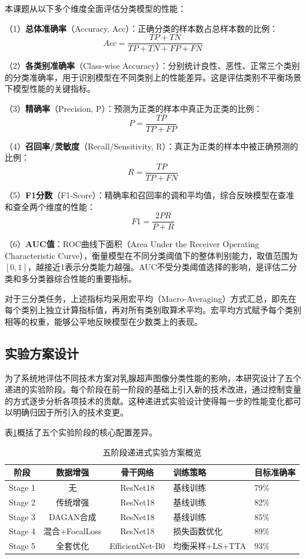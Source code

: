 本课题从以下多个维度全面评估分类模型的性能：

（1）\textbf{总体准确率}（Accuracy, Acc）：正确分类的样本数占总样本数的比例：
$$Acc = \frac{TP + TN}{TP + TN + FP + FN}$$

（2）\textbf{各类别准确率}（Class-wise Accuracy）：分别统计良性、恶性、正常三个类别的分类准确率，用于识别模型在不同类别上的性能差异。这是评估类别不平衡场景下模型性能的关键指标。

（3）\textbf{精确率}（Precision, P）：预测为正类的样本中真正为正类的比例：
$$P = \frac{TP}{TP + FP}$$

（4）\textbf{召回率/灵敏度}（Recall/Sensitivity, R）：真正为正类的样本中被正确预测的比例：
$$R = \frac{TP}{TP + FN}$$

（5）\textbf{F1分数}（F1-Score）：精确率和召回率的调和平均值，综合反映模型在查准和查全两个维度的性能：
$$F1 = \frac{2PR}{P + R}$$

（6）\textbf{AUC值}：ROC曲线下面积（Area Under the Receiver Operating Characteristic Curve），衡量模型在不同分类阈值下的整体判别能力，取值范围为$[0, 1]$，越接近1表示分类能力越强。AUC不受分类阈值选择的影响，是评估二分类和多分类器综合性能的重要指标。

对于三分类任务，上述指标均采用宏平均（Macro-Averaging）方式汇总，即先在每个类别上独立计算指标值，再对所有类别取算术平均。宏平均方式赋予每个类别相等的权重，能够公平地反映模型在少数类上的表现。


\subsection{实验方案设计}

为了系统地评估不同技术方案对乳腺超声图像分类性能的影响，本研究设计了五个递进的实验阶段。每个阶段在前一阶段的基础上引入新的技术改进，通过控制变量的方式逐步分析各项技术的贡献。这种递进式实验设计使得每一步的性能变化都可以明确归因于所引入的技术变更。

表\ref{tbl:stages_overview}概括了五个实验阶段的核心配置差异。

\begin{table}[htb]
    \centering
    \caption{五阶段递进式实验方案概览}
    \label{tbl:stages_overview}
    \begin{tabular}{cccll}
        \toprule
        阶段 & 数据增强 & 骨干网络 & 训练策略 & 目标准确率 \\
        \midrule
        Stage 1 & 无       & ResNet18     & 基线训练         & 79\% \\
        Stage 2 & 传统增强 & ResNet18     & 基线训练         & 82\% \\
        Stage 3 & DAGAN合成 & ResNet18     & 基线训练         & 85\% \\
        Stage 4 & 混合+FocalLoss & ResNet18 & 损失函数优化 & 89\% \\
        Stage 5 & 全套优化 & EfficientNet-B0 & 均衡采样+LS+TTA & 93\% \\
        \bottomrule
    \end{tabular}
\end{table}

